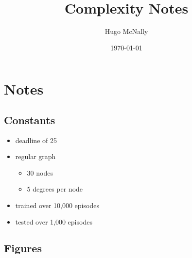 \documentclass[a4paper]{article}
\title{Complexity Notes}
\date{\today}
\author{Hugo McNally}
\begin{document}
\section*{Notes}

\subsection*{Constants}
\begin{itemize}
    \item deadline of 25
    \item regular graph
    \begin{itemize}
        \item 30 nodes
        \item 5 degrees per node
    \end{itemize}
    \item trained over 10,000 episodes
    \item tested over 1,000 episodes
\end{itemize}

\subsection*{Figures}
\end{document}
